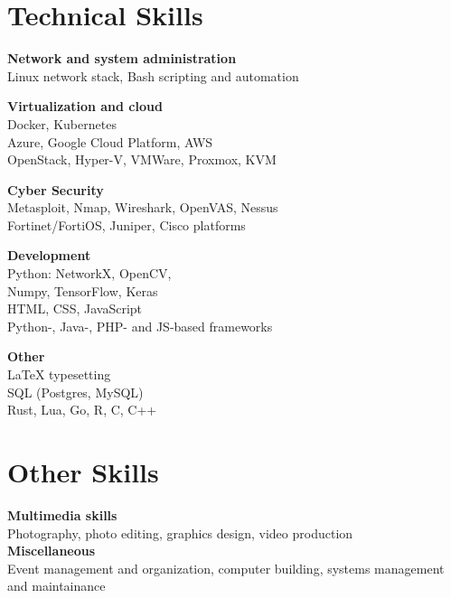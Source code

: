 \documentclass[11pt,a4paper]{article}
\begin{document}
\section{Technical Skills}
\begin{minipage}{.5\textwidth}%
    
    \textbf{Network and system administration} \\
    { \small
    Linux network stack, Bash scripting and automation
    }
    \medskip
    
    \textbf{Virtualization and cloud} \\
    {\small
    Docker, Kubernetes \\
    Azure, Google Cloud Platform, AWS \\
    OpenStack, Hyper-V, VMWare, Proxmox, KVM 
    }
    \medskip
    
    \textbf{Cyber Security} \\
    {\small
    Metasploit, Nmap, Wireshark, OpenVAS, Nessus \\
    Fortinet/FortiOS, Juniper, Cisco platforms 
    }
    
\end{minipage}%
\begin{minipage}{.5\textwidth}%
    \textbf{Development} \\
    {\small
    Python: NetworkX, OpenCV, \\
    Numpy, TensorFlow, Keras \\
    HTML, CSS, JavaScript \\
    Python-, Java-, PHP- and JS-based frameworks
    }
    \medskip
    
    \textbf{Other} \\
    { \small
    LaTeX typesetting \\
    SQL (Postgres, MySQL) \\
    Rust, Lua, Go, R, C, C++
    }
\end{minipage}

\section{Other Skills}

\small{
    \textbf{Multimedia skills} \\
    Photography, photo editing, graphics design, video production \\
    \medskip
    \textbf{Miscellaneous} \\
    Event management and organization, computer building, systems management and maintainance
}
\end{document}
